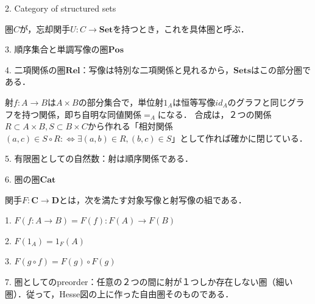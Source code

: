 \documentclass[uplatex, 12pt, dvipdfmx]{jsarticle}
\begin{document}
2. Category of structured sets
\begin{definition*}[具体圏]
    圏$C$が，忘却関手$U:C\to\mathbf{Set}$を持つとき，これを具体圏と呼ぶ．
\end{definition*}

3. 順序集合と単調写像の圏$\mathbf{Pos}$

4. 二項関係の圏$\mathbf{Rel}$：写像は特別な二項関係と見れるから，$\mathbf{Sets}$はこの部分圏である．

射$f:A\to B$は$A\times B$の部分集合で，単位射$1_A$は恒等写像$id_A$のグラフと同じグラフを持つ関係，即ち自明な同値関係$=_A$になる．
合成は，２つの関係$R\subset A\times B, S\subset B\times C$から作れる「相対関係$(a,c)\in S\circ R:\Leftrightarrow \exists (a,b)\in R, (b,c)\in S$」として作れば確かに閉じている．

5. 有限圏としての自然数：射は順序関係である．

6. 圏の圏$\mathbf{Cat}$
\begin{definition}[Functor]
    関手$F:\mathbf{C}\to\mathbf{D}$とは，次を満たす対象写像と射写像の組である．

    1. $F(f:A\to B)=F(f):F(A)\to F(B)$

    2. $F(1_A)=1_F(A)$

    3. $F(g\circ f)=F(g)\circ F(g)$
\end{definition}

7. 圏としてのpreorder：任意の２つの間に射が１つしか存在しない圏（細い圏）．従って，Hesse図の上に作った自由圏そのものである．
\end{document}
